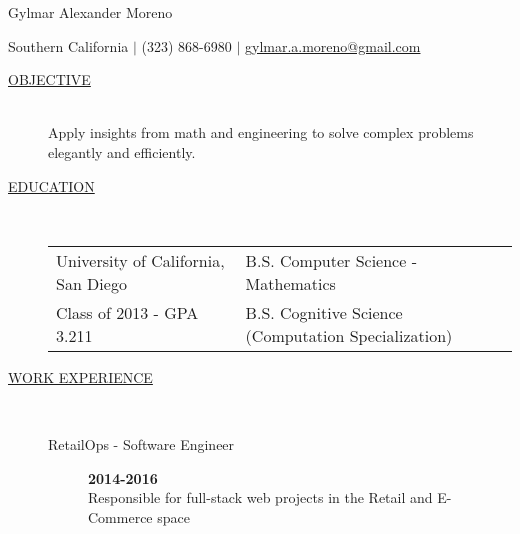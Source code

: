 \documentclass[11pt]{article}
\begin{document}
\center
{
	\LARGE{Gylmar Alexander Moreno}
}


	Southern California $\mid$ (323) 868-6980 $\mid$
\href{mailto:gylmar.a.moreno@gmail.com}{gylmar.a.moreno@gmail.com}
\begin{description}
    \item[\underline{OBJECTIVE}] \hfill \\
        Apply insights from math and engineering to solve complex problems elegantly and efficiently.

    \item[\underline{EDUCATION}]  \hfill \\
        \begin{tabular}{l|l}
            University of California, San Diego & B.S. Computer Science - Mathematics \\
            \hfill Class of 2013 - GPA 3.211    & B.S. Cognitive Science (Computation Specialization)\\
		\end{tabular}

    \item[\underline{WORK EXPERIENCE}] \hfill \\
		\begin{description}
            \item[RetailOps - Software Engineer] \hfill \textbf{2014-2016}\\
                \hspace{-9mm}Responsible for full-stack web projects in the Retail and E-Commerce space\\


\end{description}
\end{description}
\end{document}
